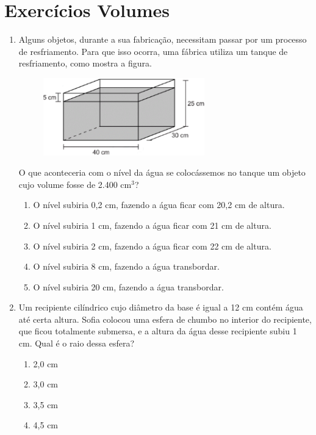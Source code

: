 \documentclass[twocolumn,oneside,a4paper,12.0pt]{article}
\begin{document}
\section*{Exercícios Volumes}
\begin{enumerate}	
\item Alguns objetos, durante a sua fabricação, necessitam passar por um processo de resfriamento. Para que isso ocorra, uma fábrica utiliza um tanque de resfriamento, como mostra a figura.

	\begin{figure}[!htb]
	\center
	\includegraphics[width=7cm]{Extras/v1.png}
	\end{figure}

O que aconteceria com o nível da água se colocássemos no tanque um objeto cujo volume fosse de 2.400 cm$^3$? 	

	\begin{enumerate}
	\item O nível subiria 0,2 cm, fazendo a água ficar com 20,2 cm de altura. 
	\item O nível subiria 1 cm, fazendo a água ficar com 21 cm de altura. 
	\item O nível subiria 2 cm, fazendo a água ficar com 22 cm de altura. 
	\item O nível subiria 8 cm, fazendo a água transbordar. 
	\item O nível subiria 20 cm, fazendo a água transbordar.
	\end{enumerate}

\item Um recipiente cilíndrico cujo diâmetro da base é igual a 12 cm contém água até certa altura. Sofia colocou uma esfera de chumbo no interior do recipiente, que ficou totalmente submersa, e a altura da água desse recipiente subiu 1 cm. Qual é o raio dessa esfera?

	\begin{enumerate}
	\item 2,0 cm
	\item 3,0 cm
	\item 3,5 cm
	\item 4,5 cm
	\end{enumerate}


\end{enumerate}
\end{document}

